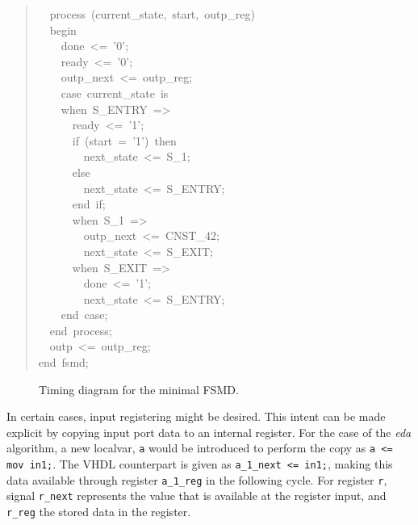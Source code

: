 \documentclass[a4paper]{article}
\begin{document}
\begin{quote}
{~~process~(current\_state,~start,~outp\_reg)\\
~~begin\\
~~~~done~<=~'0';\\
~~~~ready~<=~'0';\\
~~~~outp\_next~<=~outp\_reg;\\
~~~~case~current\_state~is\\
~~~~when~S\_ENTRY~=>\\
~~~~~~ready~<=~'1';\\
~~~~~~if~(start~=~'1')~then\\
~~~~~~~~next\_state~<=~S\_1;\\
~~~~~~else\\
~~~~~~~~next\_state~<=~S\_ENTRY;\\
~~~~~~end~if;\\
~~~~~~when~S\_1~=>\\
~~~~~~~~outp\_next~<=~CNST\_42;\\
~~~~~~~~next\_state~<=~S\_EXIT;\\
~~~~~~when~S\_EXIT~=>\\
~~~~~~~~done~<=~'1';\\
~~~~~~~~next\_state~<=~S\_ENTRY;\\
~~~~end~case;\\
~~end~process;\\
~~outp~<=~outp\_reg;\\
end~fsmd;
}
\end{quote}
\begin{figure}
\label{fsmd-minimal-timediag}
\noindent{}
\caption{Timing diagram for the minimal FSMD.}
\end{figure}

In certain cases, input registering might be desired. This intent can be made
explicit by copying input port data to an internal register. For the case of the
\emph{eda} algorithm, a new localvar, \texttt{a} would be introduced to perform the copy
as \texttt{a <= mov in1;}. The VHDL counterpart is given as \texttt{a\_1\_next <= in1;},
making this data available through register \texttt{a\_1\_reg} in the following cycle.
For register \texttt{r}, signal \texttt{r\_next} represents the value that is available at
the register input, and \texttt{r\_reg} the stored data in the register.
\end{document}
